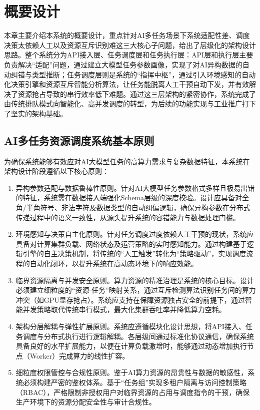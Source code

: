 \chapter{概要设计}

本章主要介绍本系统的概要设计，重点针对AI多任务场景下系统适配性差、调度决策太依赖人工以及资源互斥识别难这三大核心子问题，给出了层级化的架构设计思路。整个系统分为API接入层、任务调度层和任务执行层：API层和执行层主要负责解决“适配”问题，通过建立大模型任务参数画像，实现了对AI异构数据的自动纠错与类型推断；任务调度层则是系统的“指挥中枢”，通过引入环境感知的自动化决策引擎和资源互斥智能分析算法，让任务能脱离人工干预自动下发，并有效解决了资源抢占导致的串行效率低下难题。通过这三层架构的紧密协作，系统完成了由传统排队模式向智能化、高并发调度的转型，为后续的功能实现与工业推广打下了坚实的架构基础。

\section{AI多任务资源调度系统基本原则}

为确保系统能够有效应对AI大模型任务的高算力需求与复杂数据特征，本系统在架构设计阶段遵循以下核心原则：

\begin{enumerate}
	\item 异构参数适配与数据鲁棒性原则。针对AI大模型任务参数格式多样且极易出错的特征，系统需在数据接入端强化Schema层级的深度校验。设计应具备对全角/半角符号、非法字符及数据类型的自动纠偏逻辑，确保异构参数在分布式传递过程中的语义一致性，从源头提升系统的容错能力与数据处理门槛。
    \item 环境感知与决策自主化原则。针对任务调度过度依赖人工干预的现状，系统应具备对计算集群负载、网络状态及运营策略的实时感知能力。通过构建基于逻辑引擎的自主决策机制，将传统的“人工触发”转化为“策略驱动”，实现调度流程的自动化闭环，以提升系统在高动态环境下的响应效能。
    \item 临界资源隔离与并发安全原则。算力资源的精准治理是系统的核心目标。设计必须建立细粒度的“资源-任务”映射关系，通过互斥检测算法识别任务间的算力冲突（如GPU显存抢占）。系统应支持在保障资源独占安全的前提下，通过智能并发策略取代传统串行模式，最大化集群吞吐率并降低算力空耗。
    \item 架构分层解耦与弹性扩展原则。系统应遵循模块化设计思想，将API接入、任务调度与分布式执行进行逻辑解耦。各层级间通过标准化协议通信，确保系统具备良好的水平扩展能力，以便在计算负载激增时，能够通过动态增加执行节点（Worker）完成算力的线性扩容。
    \item 细粒度权限管控与合规性原则。鉴于AI算力资源的昂贵性与数据的敏感性，系统必须构建严密的鉴权体系。基于“任务组”实现多租户隔离与访问控制策略（RBAC），严格限制非授权用户对临界资源的占用与调度指令的干预，确保生产环境下的资源分配安全性与审计合规性。
\end{enumerate}
 

